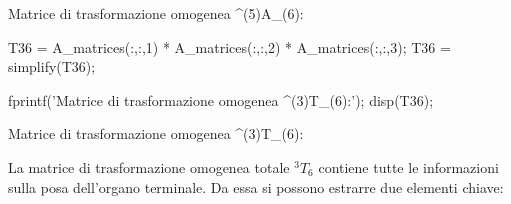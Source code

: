\documentclass[11pt, a4paper]{article}
\begin{document}
\begin{matlaboutput}
Matrice di trasformazione omogenea ^(5)A_(6):
\end{matlaboutput}
\newpage
\begin{matlabcode}
T36 = A_matrices(:,:,1) * A_matrices(:,:,2) * A_matrices(:,:,3);
T36 = simplify(T36);

fprintf('Matrice di trasformazione omogenea ^(3)T_(6):\n');
disp(T36);
\end{matlabcode}
\begin{matlaboutput}
Matrice di trasformazione omogenea ^(3)T_(6):
\end{matlaboutput}
\begin{matlabsymbolicoutput}
\end{matlabsymbolicoutput}

\begin{par}
\begin{flushleft}
La matrice di trasformazione omogenea totale $^3 T_6$ contiene tutte le informazioni sulla posa dell'organo terminale. Da essa si possono estrarre due elementi chiave:
\end{flushleft}
\end{par}
\end{document}
